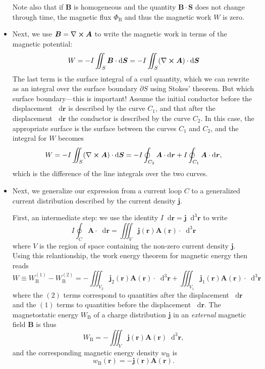 \documentclass[11pt, a4paper]{article}
\newcommand{\diff}{\mathop{}\!\mathrm{d}} %
\newcommand{\dr}{\diff^{3} \r}  %
\renewcommand{\vec}[1]{\bm{#1}} %
\renewcommand{\r}{\vec{r}}
\newcommand{\B}{\vec{B}} %
\newcommand{\A}{\vec{A}} %
\renewcommand{\j}{\vec{j}}  %
\renewcommand{\curl}{\nabla \cross}
\begin{document}
\begin{itemize}
	Note also that if $ \B $ is homogeneous and the quantity $ \B \cdot \vec{S} $ does not change through time, the magnetic flux $ \Phi_{\text{B}} $ and thus the magnetic work $ W $ is zero.
	
    \item Next, we use $ \B = \curl \A $ to write the magnetic work in terms of the magnetic potential:
	\begin{equation*}
		W = - I \iint_{S}\B \cdot \diff \vec{S} = - I \iint_{S} (\curl \A) \cdot \diff \vec{S}
	\end{equation*}
	The last term is the surface integral of a curl quantity, which we can rewrite as an integral over the surface boundary $ \partial S $ using Stokes' theorem. But which surface boundary---this is important! Assume the initial conductor before the displacement $ \diff \r $ is described by the curve $ C_{1} $, and that after the displacement $ \diff \r $ the conductor is described by the curve $ C_{2} $. In this case, the appropriate surface is the surface between the curves $ C_{1} $ and $ C_{2} $, and the integral for $ W $ becomes
	\begin{equation*}
        W = - I \iint_{S} (\curl \A) \cdot \diff \vec{S} = - I \oint_{C_{2}} \A \cdot \diff \r  + I \oint_{C_{1}} \A \cdot \diff \r,
	\end{equation*}
	which is the difference of the line integrals over the two curves.
	
	\item Next, we generalize our expression from a current loop $ C $ to a generalized current distribution described by the current density $ \j $. 

    First, an intermediate step: we use the identity $ I \diff \r = \j \dr $ to write
	\begin{equation*}
		I \oint_{C} \A \cdot \diff \r = \iiint_{V} \j(\r)\A(\r) \cdot \dr
	\end{equation*}
	where $ V $ is the region of space containing the non-zero current density $ \j $. Using this relantionship, the work energy theorem for magnetic energy then reads
	\begin{equation*}
		W \equiv W_{\mathrm{B}}^{(1)} - W_{\mathrm{B}}^{(2)} = - \iiint_{V_{2}} \j_{2}(\r) \A(\r) \cdot \dr + \iiint_{V_{1}} \j_{1}(\r) \A(\r) \cdot \dr
	\end{equation*}
    where the $ (2) $ terms correspond to quantities after the displacement $ \diff \r $ and the $ (1) $ terms to quantities before the displacement $ \diff \r $. The magnetostatic energy $ W_{\text{B}} $ of a charge distribution $ \j $ in an \textit{external} magnetic field $ \B $ is thus
	\begin{equation*}
		W_{\mathrm{B}} = - \iiint_{V}\j(\r) \A(\r) \dr,
	\end{equation*}
	and the corresponding magnetic energy density $ w_{\mathrm{B}} $ is
	\begin{equation*}
		w_{\mathrm{B}}(\r) = - \j(\r) \A (\r).
	\end{equation*}
	
\end{itemize}
\end{document}
